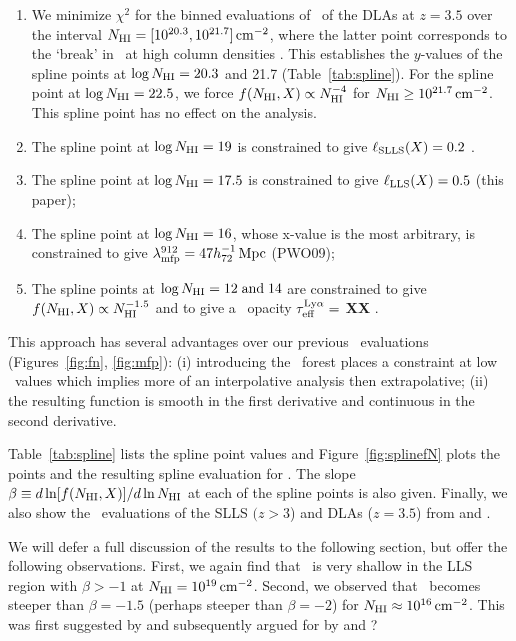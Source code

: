 \documentclass[12pt,preprint]{aastex}
\begin{document}
\begin{enumerate}
\item We minimize $\chi^2$ for the binned evaluations of \fnhi\
of the DLAs \citep{pw09} at $z=3.5$ over the interval 
$N_{\rm HI} = [10^{20.3}, 10^{21.7}] \, {\rm cm^{-2}}$, where the latter
point corresponds to the `break' in \fnhi\ at high column
densities \citep{phw05}.  This establishes the $y$-values
of the spline points at $\log N_{\rm HI} = 20.3$ and 21.7 (Table~\ref{tab:spline}).
For the spline point at $\log N_{\rm HI} = 22.5$, we force
$f(N_{\rm HI},X) \propto N_{\rm HI}^{-4}$ for $N_{\rm HI} \ge 10^{21.7} \, {\rm cm^{-2}}$.
This spline point has no effect on the analysis.

\item The spline point at $\log N_{\rm HI} = 19$ is constrained to give
$\ell_{\rm{SLLS}}(X) = 0.2$ \citep{opb+07}.
\item The spline point at $\log N_{\rm HI} = 17.5$ is constrained
to give $\ell_{\rm{LLS}}(X) = 0.5$ (this paper);
\item The spline point at $\log N_{\rm HI} = 16$, whose x-value is 
the most arbitrary, is constrained to give $\lambda_{\rm mfp}^{912} = 47 {h_{72}^{-1} \, \rm Mpc}$ (PWO09);
\item The spline points at $\log N_{\rm HI} = 12 \; {\rm and} \; 14$
are constrained to give $f(N_{\rm HI},X) \propto N_{\rm HI}^{-1.5}$ and to
give a \lya\ opacity $\tau_{\rm eff}^{\rm Ly\alpha} =$ {\bf XX} \citep{fpl+08}.
\end{enumerate}
This approach has several advantages over our previous \fnhi\ evaluations
(Figures~\ref{fig:fn}, \ref{fig:mfp}): 
(i) introducing the \lya\ forest
places a constraint at low \nhi\ values which implies more of an
interpolative analysis then extrapolative;
(ii) the resulting function is smooth in the first derivative
and continuous in the second derivative.

Table~\ref{tab:spline} lists the spline point values and
Figure~\ref{fig:splinefN} plots the points and the resulting spline
evaluation for \fnhi.  The slope $\beta \equiv d\ln[f(N_{\rm HI},X)]/d\ln N_{\rm HI}$
at each of the spline points is also given.
Finally, we also show the \fnhi\ evaluations of the SLLS $(z>3$)
and DLAs ($z=3.5$) from \cite{opb+07} and \cite{pw09}.

We will defer a full discussion of the results to the following
section, but offer the following observations.
First, we again find that \fnhi\ is very shallow in the LLS
region with $\beta > -1$ at $N_{\rm HI} = 10^{19} \, {\rm cm^{-2}}$.
Second, we observed that \fnhi\ becomes steeper than
$\beta = -1.5$ (perhaps steeper than $\beta = -2$) for
$N_{\rm HI} \approx 10^{16} \, {\rm cm^{-2}}$.  This was first
suggested by \cite{petit93} and subsequently argued for
by \cite{rauch} and \cite{misawa}?
\end{document}
